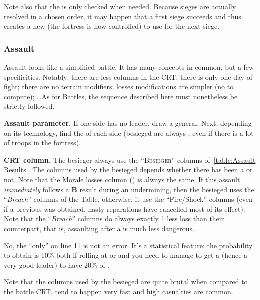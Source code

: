Note also that the \SoS is only checked when needed. Because sieges are
actually resolved in a chosen order, it may happen that a first siege succeeds
and thus creates a new \SoS (the fortress is now controlled) to use for the
next siege.

\subsubsection{Assault}
Assault looks like a simplified battle. It has many concepts in common, but a
few specificities. Notably: there are less columns in the CRT; there is only
one day of fight; there are no terrain modifiers; losses modifications are
simpler (no  to compute); \ldots As for Battles, the
sequence described here must nonetheless be strictly followed.


\textbf{Assault parameter.} If one side has no leader, draw a
 general. Next, depending on its technology, find the
 of each side (besieged are always , even if
there is a lot of  troops in the fortress).

\textbf{CRT column.} The besieger always use the ``\textsc{Besieger}'' columns
of~\ref{table:Assault Results}. The columns used by the besieged depends
whether there has been a  or not. Note that the Morale losses
column (\textetoile) is always the same. If this assault \emph{immediately}
follows a \textbf{B} result during an undermining, then the besieged uses the
``\emph{Breach}'' columns of the Table, otherwise, it use the ``Fire/Shock''
columns (even if a previous  was obtained, hasty reparations
have cancelled most of its effect). Note that the ``\emph{Breach}'' columns do
always exactly 1 less loss than their counterpart, that is, assaulting after a
 is much less dangerous.

\begin{designnote}
  No, the ``only'' \textetoile\textetoile on line 11 is not an error. It's a
  statistical feature: the probability to obtain
  \textetoile\textetoile\textetoile is 10\% both if rolling at  or
   and you need to manage to get a  (hence a very good
  leader) to have 20\% of \textetoile\textetoile\textetoile.
\end{designnote}

Note that the columns used by the besieged are quite brutal when compared to
the battle CRT. \textetoile tend to happen very fast and high casualties are
common.

